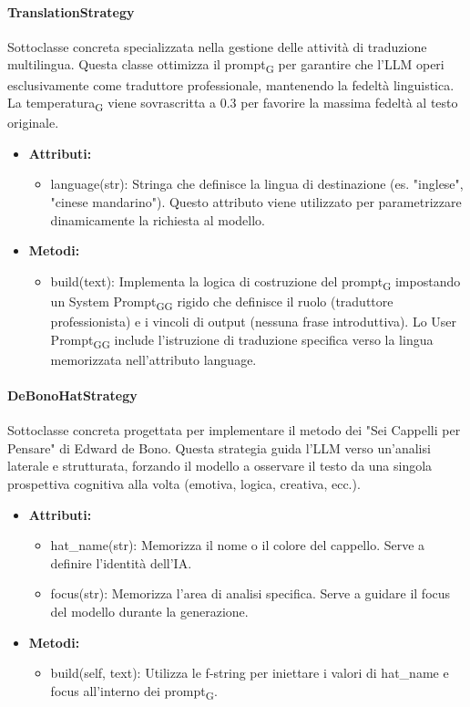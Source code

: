 \documentclass[11pt,a4paper]{article}
\newcommand{\gls}[1]{#1\textsubscript{G}}
\begin{document}
\paragraph{TranslationStrategy} 
Sottoclasse concreta specializzata nella gestione delle attività di traduzione multilingua. Questa classe ottimizza il \gls{prompt} per garantire che l'LLM operi esclusivamente come traduttore professionale, mantenendo la fedeltà linguistica. La \gls{temperatura} viene sovrascritta a 0.3 per favorire la massima fedeltà al testo originale.
\begin{itemize}
    \item \textbf{Attributi:}
\begin{itemize}
    \item language(str): Stringa che definisce la lingua di destinazione (es. "inglese", "cinese mandarino"). Questo attributo viene utilizzato per parametrizzare dinamicamente la richiesta al modello.
\end{itemize}
\item \textbf{Metodi:}
\begin{itemize}
    \item build(text): Implementa la logica di costruzione del \gls{prompt} impostando un \gls{System \gls{Prompt}} rigido che definisce il ruolo (traduttore professionista) e i vincoli di output (nessuna frase introduttiva). Lo \gls{User \gls{Prompt}} include l'istruzione di traduzione specifica verso la lingua memorizzata nell'attributo language.
\end{itemize}
\end{itemize}

\paragraph{DeBonoHatStrategy}
Sottoclasse concreta progettata per implementare il metodo dei "Sei Cappelli per Pensare" di Edward de Bono. Questa strategia guida l'LLM verso un'analisi laterale e strutturata, forzando il modello a osservare il testo da una singola prospettiva cognitiva alla volta (emotiva, logica, creativa, ecc.).
\begin{itemize}
    \item \textbf{Attributi:}
\begin{itemize}
    \item hat\_name(str): Memorizza il nome o il colore del cappello. Serve a definire l'identità dell'IA.
    \item focus(str): Memorizza l'area di analisi specifica. Serve a guidare il focus del modello durante la generazione.
\end{itemize}

\item \textbf{Metodi:}
\begin{itemize}
    \item build(self, text): Utilizza le f-string per iniettare i valori di hat\_name e focus all'interno dei \gls{prompt}.
\end{itemize}
\end{itemize}
\end{document}
